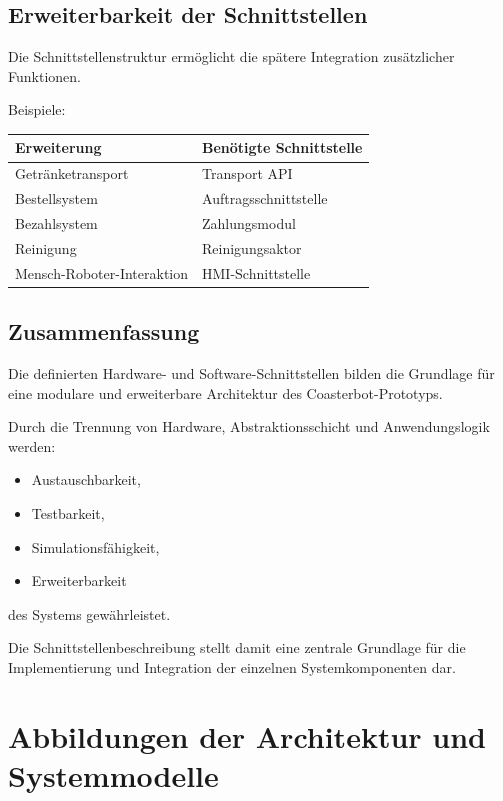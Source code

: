\documentclass[
  a4paper,
  12pt,
  DIV=12,        %
  parskip=half,  %
  headings=small %
]{scrartcl}
\theoremstyle{definition}
\providecommand{\tightlist}{%
  \setlength{\itemsep}{0pt}\setlength{\parskip}{0pt}}
\theoremstyle{definition}
\begin{document}
\subsection{Erweiterbarkeit der
Schnittstellen}\label{erweiterbarkeit-der-schnittstellen}

Die Schnittstellenstruktur ermöglicht die spätere Integration
zusätzlicher Funktionen.

Beispiele:

\begin{longtable}[]{@{}ll@{}}
\toprule\noalign{}
Erweiterung & Benötigte Schnittstelle \\
\midrule\noalign{}
\endhead
\bottomrule\noalign{}
\endlastfoot
Getränketransport & Transport API \\
Bestellsystem & Auftragsschnittstelle \\
Bezahlsystem & Zahlungsmodul \\
Reinigung & Reinigungsaktor \\
Mensch-Roboter-Interaktion & HMI-Schnittstelle \\
\end{longtable}

\subsection{Zusammenfassung}\label{zusammenfassung-8}

Die definierten Hardware- und Software-Schnittstellen bilden die
Grundlage für eine modulare und erweiterbare Architektur des
Coasterbot-Prototyps.

Durch die Trennung von Hardware, Abstraktionsschicht und Anwendungslogik
werden:

\begin{itemize}
\tightlist
\item
  Austauschbarkeit,
\item
  Testbarkeit,
\item
  Simulationsfähigkeit,
\item
  Erweiterbarkeit
\end{itemize}

des Systems gewährleistet.

Die Schnittstellenbeschreibung stellt damit eine zentrale Grundlage für
die Implementierung und Integration der einzelnen Systemkomponenten dar.

\section{Abbildungen der Architektur und
Systemmodelle}\label{abbildungen-der-architektur-und-systemmodelle}
\end{document}
